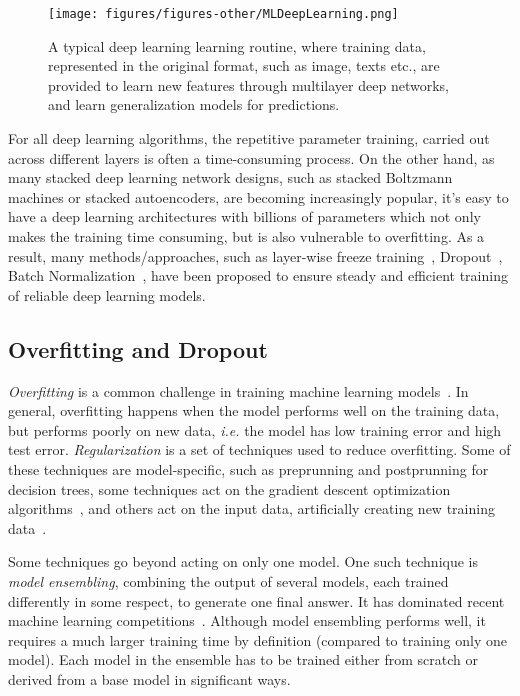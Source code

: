 \documentclass[../dropout-vs-batch-normalization.tex]{subfiles}
\begin{document}
\begin{figure*}[!htbp]
\centerline{\texttt{[image: figures/figures-other/MLDeepLearning.png]}}
\caption{A typical deep learning learning routine, where training data, represented in the original format, such as image, texts etc., are provided to learn new features through multilayer deep networks, and learn generalization models for predictions.}
\label{fig:deeplearning}
\end{figure*}

For all deep learning algorithms, the repetitive parameter training, carried out across different layers is often a time-consuming process. On the other hand, as many stacked deep learning network designs, such as stacked Boltzmann machines or stacked autoencoders, are becoming increasingly popular, it's easy to have a deep learning architectures with billions of parameters which not only makes the training time consuming, but is also vulnerable to overfitting. As a result, many methods/approaches, such as layer-wise freeze training~\cite{Brock2017}, Dropout~\cite{Srivastava2014}, Batch Normalization~\cite{Ioffe2015}, have been proposed to ensure steady and efficient training of reliable deep learning models. 


\subsection{Overfitting and Dropout}
\textit{Overfitting} is a common challenge in training machine learning models~\cite{Goodfellow2016}. In general, overfitting happens when the model performs well on the training data, but performs poorly on new data, \textit{i.e.} the model has low training error and high test error. \textit{Regularization} is a set of techniques used to reduce overfitting. Some of these techniques are model-specific, such as preprunning and postprunning for decision trees, some techniques act on the gradient descent optimization algorithms~\cite{Ruder2016}, and others act on the input data, artificially creating new training data~\cite{Perez2017}.

Some techniques go beyond acting on only one model. One such technique is \textit{model ensembling}, combining the output of several models, each trained differently in some respect, to generate one final answer. It has dominated recent machine learning competitions~\cite{Goodfellow2016}. Although model ensembling performs well, it requires a much larger training time by definition (compared to training only one model). Each model in the ensemble has to be trained either from scratch or derived from a base model in significant ways. 
\end{document}
